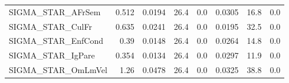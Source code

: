 \begin{tabular}{lrrrrrrr}
SIGMA\_STAR\_AFrSem  &  0.512 &   0.0194 &    26.4 &      0.0 &        0.0305 &         16.8 &           0.0 \\
SIGMA\_STAR\_CulFr   &  0.635 &   0.0241 &    26.4 &      0.0 &        0.0195 &         32.5 &           0.0 \\
SIGMA\_STAR\_EnfCond &   0.39 &   0.0148 &    26.4 &      0.0 &        0.0264 &         14.8 &           0.0 \\
SIGMA\_STAR\_IgPare  &  0.354 &   0.0134 &    26.4 &      0.0 &        0.0297 &         11.9 &           0.0 \\
SIGMA\_STAR\_OmLmVel &   1.26 &   0.0478 &    26.4 &      0.0 &        0.0325 &         38.8 &           0.0 \\
\bottomrule
\end{tabular}

